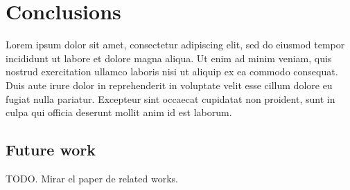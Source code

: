 

\chapter{Conclusions} \label{cha:concl}



\drop Lorem ipsum dolor sit amet, consectetur adipiscing elit, sed do eiusmod
tempor incididunt ut labore et dolore magna aliqua. Ut enim ad minim veniam,
quis nostrud exercitation ullamco laboris nisi ut aliquip ex ea commodo
consequat. Duis aute irure dolor in reprehenderit in voluptate velit esse
cillum dolore eu fugiat nulla pariatur. Excepteur sint occaecat cupidatat non
proident, sunt in culpa qui officia deserunt mollit anim id est laborum.



\section{Future work}

TODO. Mirar el paper de related works.
